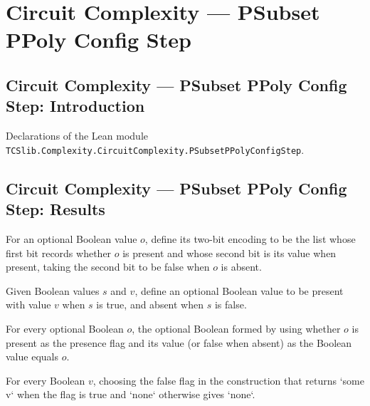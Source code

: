 \section{Circuit Complexity --- PSubset PPoly Config Step}
\subsection*{Circuit Complexity --- PSubset PPoly Config Step: Introduction}

Declarations of the Lean module \texttt{TCSlib.Complexity.CircuitComplexity.PSubsetPPolyConfigStep}.

\subsection*{Circuit Complexity --- PSubset PPoly Config Step: Results}

\begin{definition}
\label{Complexity.CfgTableau.optBits}
\leanok
For an optional Boolean value $o$, define its two-bit encoding to be the list whose
first bit records whether $o$ is present and whose second bit is its value when present,
taking the second bit to be false when $o$ is absent.
\end{definition}

\begin{definition}
\label{Complexity.CfgTableau.optOf}
\leanok
Given Boolean values $s$ and $v$, define an optional Boolean value to be present with
value $v$ when $s$ is true, and absent when $s$ is false.
\end{definition}

\begin{theorem}
\label{Complexity.CfgTableau.optOf_isSome_getD}
\leanok
{}
For every optional Boolean $o$, the optional Boolean formed by using whether $o$ is
present as the presence flag and its value (or false when absent) as the Boolean value
equals $o$.
\end{theorem}

\begin{theorem}
\label{Complexity.CfgTableau.optOf_false}
\leanok
{}
For every Boolean $v$, choosing the false flag in the construction that returns `some v`
when the flag is true and `none` otherwise gives `none`.
\end{theorem}

